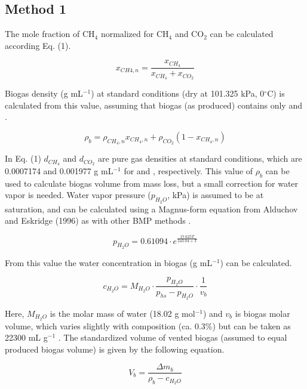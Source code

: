 \documentclass[]{article}
\begin{document}
\subsection{Method 1}

The mole fraction of CH$_{4}$ normalized for CH$_{4}$ and CO$_{2}$ can be calculated according Eq. (1). 

\begin{equation}
  \label{eq:xch4n}
    x_{CH{4},n} = \frac{x_{CH_4}}{x_{CH_4} + x_{CO_2}}
\end{equation}

Biogas density (g mL$^{-1}$) at standard conditions (dry at 101.325 kPa, 0$^\circ$C) is calculated from this value, assuming that biogas (as produced) contains only  and .

\begin{equation}
  \label{eq:dens1}
  \rho_b = \rho_{CH_4,n} x_{CH_4,n} + \rho_{CO_2} (1 - x_{CH_4,n})
\end{equation}

In Eq. (1) $d_{CH_4}$ and $d_{CO_2}$ are pure gas densities at standard conditions, which are 0.0007174 and 0.001977 g mL$^{-1}$ for  and , respectively.
This value of $\rho_b$ can be used to calculate biogas volume from mass loss, but a small correction for water vapor is needed.
Water vapor pressure ($p_{H_2O}$, kPa) is assumed to be at saturation, and can be calculated using a Magnus-form equation from Alduchov and Eskridge (1996) as with other BMP methods \cite{bmpmethods}.

\begin{equation}
\label{eq:magnus}
   p_{H_2O} = 0.61094 \cdot e^{\frac{17.625 T}{243.04 + T}}
\end{equation}

From this value the water concentration in biogas (g mL$^{-1}$) can be calculated.

\begin{equation}
  \label{eq:ch2o}
  c_{H_2O}=M_{H_2O} \cdot \frac{p_{H_2O}}{p_{hs} - p_{H_2O}} \cdot \frac{1}{v_b}
\end{equation}

Here, $M_{H_2O}$ is the molar mass of water (18.02 g mol$^{-1}$) and $v_b$ is biogas molar volume, which varies slightly with composition (ca. 0.3\%) but can be taken as 22300 mL g$^{-1}$ \cite{validation}.
The standardized volume of vented biogas (assumed to equal produced biogas volume) is given by the following equation.

\begin{equation}
  \label{eq:vb1}
  V_b = \frac{\Delta m_b}{\rho_b - c_{H_2O}}
\end{equation}
\end{document}
